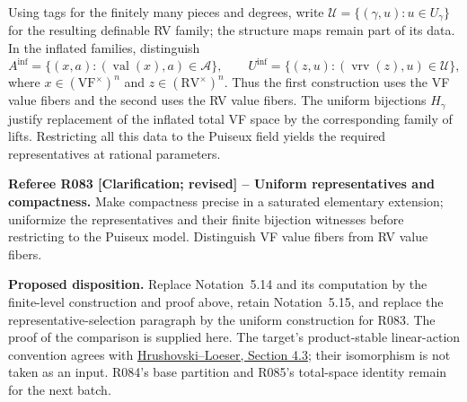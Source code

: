 \documentclass[12pt]{amsart}
\theoremstyle{remark}
\theoremstyle{definition}
\newcommand{\RV}{\mathrm{RV}}
\newcommand{\VF}{\mathrm{VF}}
\newcommand{\vrv}{\operatorname{vrv}}
\numberwithin{equation}{section}
\newcommand{\vv}{\operatorname{val}}
\begin{document}
{Using tags for the finitely many pieces and degrees, write
$\mathcal U=\{(\gamma,u):u\in U_\gamma\}$ for the resulting
definable RV family; the structure maps remain part of its data.
In the inflated families, distinguish
\[
 A^{\mathrm{inf}}
   =\{(x,a):(\vv(x),a)\in\mathcal A\},
 \qquad
 U^{\mathrm{inf}}
   =\{(z,u):(\vrv(z),u)\in\mathcal U\},
\]
where $x\in(\VF^\times)^n$ and $z\in(\RV^\times)^n$.
Thus the first construction uses the VF value fibers and the
second uses the RV value fibers. The uniform bijections
$H_\gamma$ justify replacement of the inflated total VF space
by the corresponding family of lifts. Restricting all this
data to the Puiseux field yields the required representatives
at rational parameters.
}
\medskip

{\normalfont\small\color{RefereePurple}
\noindent\textbf{Referee R083 [Clarification; revised] --
Uniform representatives and compactness.}
Make compactness precise in a saturated elementary extension;
uniformize the representatives and their finite bijection
witnesses before restricting to the Puiseux model. Distinguish
VF value fibers from RV value fibers.\par}
\medskip

{\normalfont\small\color{ProposalOrange}
\noindent\textbf{Proposed disposition.}
Replace Notation~5.14 and its computation by the finite-level
construction and proof above, retain Notation~5.15, and replace
the representative-selection paragraph by the uniform construction
for R083. The proof of the comparison is supplied here.
The target's product-stable linear-action convention agrees with
\href{https://arxiv.org/pdf/1111.1954}{Hrushovski--Loeser,
Section 4.3}; their isomorphism is not taken as an input.
R084's base partition and R085's total-space identity remain
for the next batch.}
\end{document}
